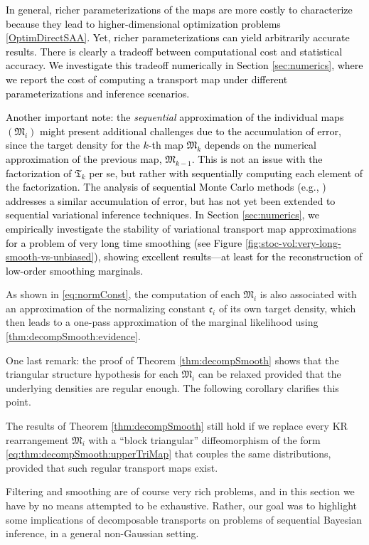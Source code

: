 \documentclass[twoside,11pt]{article}
\newcommand{\submap}{\mathfrak{M}}
\newcommand{\hrevone}{\textcolor{black} }
\begin{document}
%
\hrevone{In general, richer parameterizations of the maps are more
  costly to characterize because they lead to higher-dimensional
  optimization problems \eqref{OptimDirectSAA}.  Yet, richer
  parameterizations can yield arbitrarily accurate results.  There is
  clearly a tradeoff between computational 
  cost
  and statistical
  accuracy.
%
We investigate this tradeoff numerically in Section
\ref{sec:numerics}, where we report the cost of computing a transport
map under different parameterizations and inference scenarios.}

\hrevone{Another important note: the {\it sequential} approximation of
  the individual maps $(\submap_i)$ might present additional
  challenges due to the accumulation of error, since the target
  density for the $k$-th map $\submap_k$ depends on the numerical
  approximation of the previous map, $\submap_{k-1}$. This is not an
  issue with the factorization of $\mathfrak{T}_k$ per se, but rather
  with sequentially computing each element of the factorization. The
  analysis of sequential Monte Carlo methods (e.g.,
  \citealp{crisan2002survey,del2004feynman,smith2013sequential})
  addresses a similar accumulation of error, but 
has not yet been
    extended to
%
%
%
  sequential variational inference techniques. In Section
  \ref{sec:numerics}, we empirically investigate the stability of
  variational transport map approximations for a problem of very long
  time smoothing (see Figure
  \ref{fig:stoc-vol:very-long-smooth-vs-unbiased}), showing excellent
  results---at least for the reconstruction of low-order smoothing
  marginals.}

%
%
%
%
%
%
%
%
%
%
%
%
%
%
%
%
%
%
%
%
%
%
%
%
%
%
%
%
%
%
%
%
%
%
%

As shown in \eqref{eq:normConst}, the computation of each %
$\submap_i$ is also associated with an approximation of the normalizing constant $\mathfrak{c}_i$ of
its own target density, which then leads to a one-pass approximation of the
marginal likelihood using \eqref{thm:decompSmooth:evidence}.


One last remark: 
the proof of Theorem \ref{thm:decompSmooth} shows
that 
the triangular structure hypothesis for each $\submap_i$
%
can be relaxed provided
that the underlying densities are regular enough. The following
corollary clarifies this point.
\begin{corollary} \label{cor:genDecompThmChains}
The results of Theorem \ref{thm:decompSmooth} still hold  if we replace
every KR rearrangement $\submap_i$ with a ``block triangular''  diffeomorphism of the form
\eqref{eq:thm:decompSmooth:upperTriMap}
%
%
that
%
couples the same distributions, provided
that such  regular transport maps exist.
%
%
\end{corollary}
Filtering and smoothing are of course very rich problems, and in this
section we have by no means attempted to be exhaustive. Rather, our
goal was to highlight some 
%
%
%
implications of decomposable transports
on problems of %
sequential Bayesian inference, in a general non-Gaussian setting.  
%
%
%
%
\end{document}
